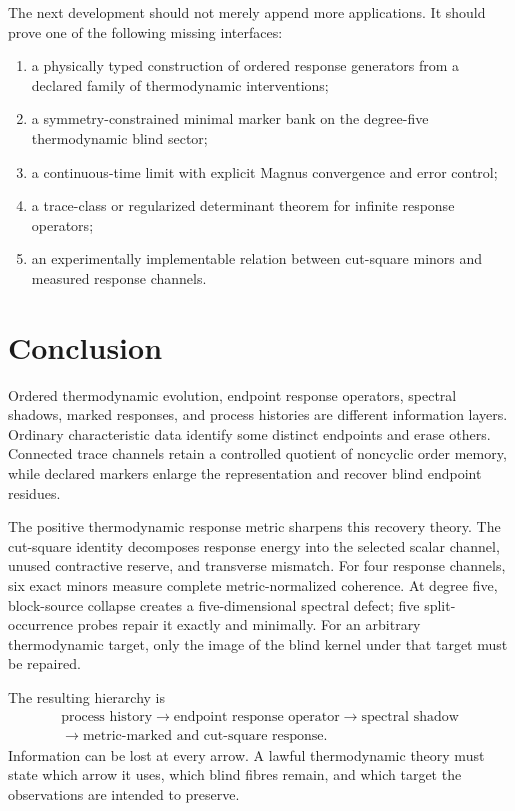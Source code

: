 The next development should not merely append more applications. It should prove one of the following missing interfaces:
\begin{enumerate}[label=(\arabic*)]
\item a physically typed construction of ordered response generators from a declared family of thermodynamic interventions;
\item a symmetry-constrained minimal marker bank on the degree-five thermodynamic blind sector;
\item a continuous-time limit with explicit Magnus convergence and error control;
\item a trace-class or regularized determinant theorem for infinite response operators;
\item an experimentally implementable relation between cut-square minors and measured response channels.
\end{enumerate}

\section{Conclusion}

Ordered thermodynamic evolution, endpoint response operators, spectral shadows, marked responses, and process histories are different information layers. Ordinary characteristic data identify some distinct endpoints and erase others. Connected trace channels retain a controlled quotient of noncyclic order memory, while declared markers enlarge the representation and recover blind endpoint residues.

The positive thermodynamic response metric sharpens this recovery theory. The cut-square identity decomposes response energy into the selected scalar channel, unused contractive reserve, and transverse mismatch. For four response channels, six exact minors measure complete metric-normalized coherence. At degree five, block-source collapse creates a five-dimensional spectral defect; five split-occurrence probes repair it exactly and minimally. For an arbitrary thermodynamic target, only the image of the blind kernel under that target must be repaired.

The resulting hierarchy is
\[
\begin{gathered}
 \text{process history}
 \longrightarrow
 \text{endpoint response operator}
 \longrightarrow
 \text{spectral shadow}\\
 \longrightarrow
 \text{metric-marked and cut-square response}.
\end{gathered}
\]
Information can be lost at every arrow. A lawful thermodynamic theory must state which arrow it uses, which blind fibres remain, and which target the observations are intended to preserve.

